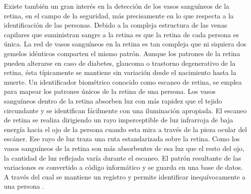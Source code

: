 Existe tambi\'en un gran inter\'es en la detecci\'on de los vasos sangu\'ineos de la retina, en el campo de la seguridad, m\'as precisamente en lo que respecta a la identificaci\'on de las  personas. Debido a la compleja estructura de las venas capilares que suministran sangre a la retina es que la retina de cada persona es \'unica. La red de vasos sangu\'ineos en la retina es tan compleja que ni siquiera dos gemelos id\'enticos comparten el mismo patr\'on. Aunque los patrones de la retina pueden alterarse en caso de diabetes, glaucoma o trastorno degenerativo de la retina, \'esta t\'ipicamente se mantiene sin variaci\'on desde el nacimiento hasta la muerte. Un identificador biom\'etrico conocido como escaneo de retina, se emplea para mapear los patrones \'unicos de la retina de una persona. Los vasos sangu\'ineos dentro de la retina absorben luz con m\'as rapidez que el tejido circundante y se identifican f\'acilmente con una iluminaci\'on apropiada. \cite{hill2002retina}
El escaneo de retina se realiza dirigiendo un rayo imperceptible de luz infrarroja de baja energ\'ia hacia el ojo de la persona cuando esta mira a trav\'es de la pieza ocular del esc\'aner. Ese rayo de luz traza una ruta estandarizada sobre la retina. Como los vasos sangu\'ineos de la retina son m\'as absorbentes de esa luz que el resto del ojo, la cantidad de luz reflejada var\'ia durante el escaneo. El patr\'on resultante de las variaciones es convertido a c\'odigo inform\'atico y se guarda en una base de datos. A trav\'es del cual se mantiene  un registro y permite identificar inequ\'ivocamente a una persona \cite{reillo2000iris} \cite{alonso2012analisis} \cite{kose2011personal}.

